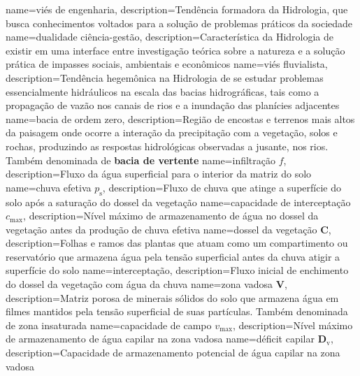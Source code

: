 {
    name=viés de engenharia,
    description={Tendência formadora da Hidrologia, que busca conhecimentos voltados para a solução de problemas práticos da sociedade}
}
{
    name=dualidade ciência-gestão,
    description={Característica da Hidrologia de existir em uma interface entre investigação teórica sobre a natureza e a solução prática de impasses sociais, ambientais e econômicos}
}
{
    name=viés fluvialista,
    description={Tendência hegemônica na Hidrologia de se estudar problemas essencialmente hidráulicos na escala das bacias hidrográficas, tais como a propagação de vazão nos canais de rios e a inundação das planícies adjacentes}
}
{
    name=bacia de ordem zero,
    description={Região de encostas e terrenos mais altos da paisagem onde ocorre a interação da precipitação com a vegetação, solos e rochas, produzindo as respostas hidrológicas observadas a jusante, nos rios. Também denominada de \textbf{bacia de vertente}}
}
{
    name=infiltração $f$,
    description={Fluxo da água superficial para o interior da matriz do solo}
}
{
    name=chuva efetiva $p_{\text{s}}$,
    description={Fluxo de chuva que atinge a superfície do solo após a saturação do dossel da vegetação}
}
{
    name=capacidade de interceptação $c_{\text{max}}$,
    description={Nível máximo de armazenamento de água no dossel da vegetação antes da produção de chuva efetiva}
}
{
    name=dossel da vegetação $\textbf{C}$,
    description={Folhas e ramos das plantas que atuam como um compartimento ou reservatório que armazena água pela tensão superficial antes da chuva atigir a superfície do solo}
}
{
    name=interceptação,
    description={Fluxo inicial de enchimento do dossel da vegetação com água da chuva}
}
{
    name=zona vadosa $\textbf{V}$,
    description={Matriz porosa de minerais sólidos do solo que armazena água em filmes mantidos pela tensão superficial de suas partículas. Também denominada de zona insaturada}
}
{
    name=capacidade de campo $v_{\text{max}}$,
    description={Nível máximo de armazenamento de água capilar na zona vadosa}
}
{
    name=déficit capilar $\textbf{D}_\text{v}$,
    description={Capacidade de armazenamento potencial de água capilar na zona vadosa}
}
